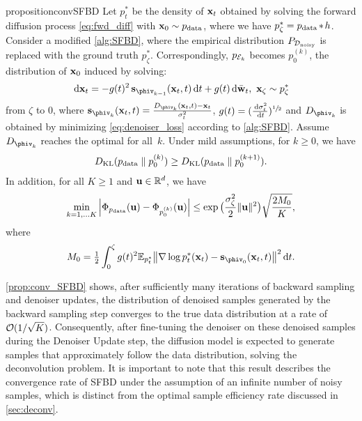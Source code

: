 \begin{restatable}{proposition}{convSFBD}
\label{prop:conv_SFBD}
	Let $p^*_t$ be the density of $\mathbf{x}_t$ obtained by solving the forward diffusion process \cref{eq:fwd_diff} with $\mathbf{x}_0 \sim p_\text{data}$, where we have $p^*_\zeta = p_{\rm data} \hspace{-0.1em}*\hspace{-0.1em} h$. Consider a modified \cref{alg:SFBD}, where the empirical distribution $P_{\mathcal{D}_\text{noisy}}$ is replaced with the ground truth $p^*_\zeta$.  Correspondingly, $p_{{\mathcal{E}}_k}$ becomes $p_0^{(k)}$, the distribution of $\mathbf{x}_0$ induced by solving:
	\begin{align}
		\diff \xv_t = - g(t)^2 \, \sv_{\phiv_{k-1}}(\xv_t, t) \diff t + g(t) \diff \bar\wv_t, ~\xv_\zeta \sim p^*_\zeta \label{eq:conv_SFBD:bwd}
	\end{align}
	from $\zeta$ to $0$, where $\sv_{\phiv_k}(\xv_t, t) = \frac{D_{\phiv_k}(\xv_t, t) - \xv_t}{\sigma_t^2}$, $g(t) = (\frac{\,\mathrm{d} \sigma^2_t}{\,\mathrm{d} t})^{\sfrac{1}{2}}$ and $D_{{\phiv}_k}$ is obtained by minimizing \eqref{eq:denoiser_loss} according to \cref{alg:SFBD}. Assume $D_{{\phiv}_k}$ reaches the optimal for all~$k$. Under mild assumptions, for $k \geq 0$, we have
	\begin{align}
		D_{\mathrm{KL}}({p_\text{data}} \; \| \; {p_0^{(k)}}) \geq D_{\mathrm{KL}}({p_\text{data}} \; \| \; {p_0^{(k+1)}}). \label{eq:conv_SFBD:monotone}
	\end{align}
	In addition, for all $K \geq 1$ and $\mathbf{u} \in \mathbb{R}^d$, we have
	\begin{align*}
			\min_{k = 1,\ldots K}\left|\Phi_{p_\text{data}}(\mathbf{u}) - \Phi_{p_0^{(k)}}(\mathbf{u})\right|\leq \exp \big(\frac{\sigma_\zeta^2}{2} \|\mathbf{u}\|^2 \big) \sqrt{\frac{2 M_0}{K}},
	\end{align*}	
	 where
	\begin{align*}
		M_0 = \tfrac{1}{2} \int_0^\zeta g(t)^2 \Eb_{p_{t}^*}\big\|\nabla \log p^*_t(\xv_t) - \sv_{\phiv_0}(\xv_t, t) \big\|^2 \diff t. 
	\end{align*}
\end{restatable}
\cref{prop:conv_SFBD} shows, after sufficiently many iterations of backward sampling and denoiser updates, the distribution of denoised samples generated by the backward sampling step converges to the true data distribution at a rate of $\mathcal{O}(1 / \sqrt{K})$. Consequently, after fine-tuning the denoiser on these denoised samples during the Denoiser Update step, the diffusion model is expected to generate samples that approximately follow the data distribution, solving the deconvolution problem. It is important to note that this result describes the convergence rate of SFBD under the assumption of an infinite number of noisy samples, which is distinct from the optimal sample efficiency rate discussed in \cref{sec:deconv}.

